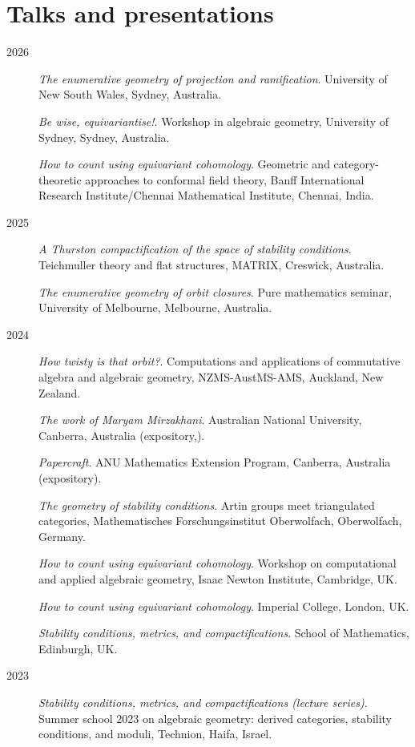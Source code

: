 \documentclass[11pt]{article}
\begin{document}
\section*{Talks and presentations}
\label{sec:orgf9230c3}

\label{org6ae69b0}
\begin{description}
\item[{2026}] \emph{The enumerative geometry of projection and ramification}.
University of New South Wales, Sydney, Australia.

\emph{Be wise, equivariantise!}.
Workshop in algebraic geometry, University of Sydney, Sydney, Australia.

\emph{How to count using equivariant cohomology}.
Geometric and category-theoretic approaches to conformal field theory, Banff International Research Institute/Chennai Mathematical Institute, Chennai, India.
\item[{2025}] \emph{A Thurston compactification of the space of stability conditions}.
Teichmuller theory and flat structures, MATRIX, Creswick, Australia.

\emph{The enumerative geometry of orbit closures}.
Pure mathematics seminar, University of Melbourne, Melbourne, Australia.
\item[{2024}] \emph{How twisty is that orbit?}.
Computations and applications of commutative algebra and algebraic geometry, NZMS-AustMS-AMS, Auckland, New Zealand.

\emph{The work of Maryam Mirzakhani}.
Australian National University, Canberra, Australia (expository,).

\emph{Papercraft}.
ANU Mathematics Extension Program, Canberra, Australia (expository).

\emph{The geometry of stability conditions}.
Artin groups meet triangulated categories, Mathematisches Forschungsinstitut Oberwolfach, Oberwolfach, Germany.

\emph{How to count using equivariant cohomology}.
Workshop on computational and applied algebraic geometry, Isaac Newton Institute, Cambridge, UK.

\emph{How to count using equivariant cohomology}.
Imperial College, London, UK.

\emph{Stability conditions, metrics, and compactifications}.
School of Mathematics, Edinburgh, UK.
\item[{2023}] \emph{Stability conditions, metrics, and compactifications (lecture series)}.
Summer school 2023 on algebraic geometry: derived categories, stability conditions, and moduli, Technion, Haifa, Israel.


\end{description}
\end{document}
